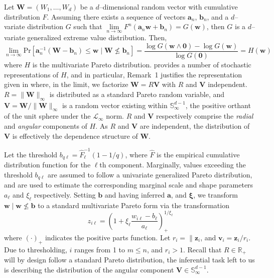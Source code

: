 Let $\bm{W} = (W_1,\ldots,W_d)$ be a $d$--dimensional random vector with 
    cumulative distribution $F$.  Assuming there exists a sequence of vectors
    $\bm{a}_n$, $\bm{b}_n$, and a $d$--variate distribution $G$ such that 
    $\lim\limits_{n\to\infty}F^n(\bm{a}_n\bm{w} + \bm{b}_n) = G(\bm{w})$, then
    $G$ is a $d$--variate generalized extreme value distribution.  Then,
    \[
        \lim\limits_{n\to\infty}\text{Pr}
            \left[\bm{a}_n^{-1}(\bm{W} - \bm{b}_n) 
                \leq \bm{w}\mid \bm{W}\not\leq \bm{b}_n\right]
        = \frac{\log G(\bm{w}\wedge \bm{0}) - \log G(\bm{w})}{\log G(\bm{0})}
        = H(\bm{w})
    \]
    where $H$ is the multivariate Pareto distribution.  \cite{rootzen2018}
    provides a number of stochastic representations of $H$, and in particular,
    Remark~1 justifies the representation given in \cite{ferreira2014} where,
    in the limit, we factorize $\bm{W} = R\bm{V}$ with $R$ and $\bm{V}$ independent.
    $R = \lVert \bm{W}\rVert_{\infty}$ is distributed as a standard Pareto random
    variable, and $\bm{V} = \bm{W} / \lVert \bm{W}\rVert_{\infty}$ is a random
    vector existing within $\mathbb{S}_{\infty}^{d-1}$, the positive orthant of
    the unit sphere under the $\mathcal{L}_{\infty}$ norm.  $R$ and $\bm{V}$
    respectively comprise the \emph{radial} and \emph{angular} components of $H$.
    As $R$ and $\bm{V}$ are independent,  the distribution of $\bm{V}$ is 
    effectively the dependence structure of $\bm{W}$.

Let the threshold $b_{q\ell} = \hat{F}_{\ell}^{-1}(1 - 1/q)$, where $\hat{F}$ is
    the empirical cumulative distribution function for the $\ell$th component.
    Marginally, values exceeding the threshold $b_{q\ell}$ are assumed to follow
    a univariate generalized Pareto distribution, and are used to estimate the
    corresponding marginal scale and shape parameters $a_{\ell}$ and $\xi_{\ell}$
    respectively.  Setting $\bm{b}$ and having inferred $\bm{a}$, and $\bm{\xi}$, 
    we transform $\bm{w}\mid \bm{w}\not\leq \bm{b}$ to a standard multivariate 
    Pareto form via the transformation
    \begin{equation}
        z_{i\ell} = \left(1 + \xi_{\ell}\frac{w_{i\ell} 
            - b_{\ell}}{a_{\ell}}\right)_{+}^{1 / \xi_{\ell}}
    \end{equation}
    where $(\cdot)_+$ indicates the positive parts function.  Let 
    $r_i = \lVert \bm{z}_i$, and $\bm{v}_i = \bm{z}_i / r_i$.  Due to 
    thresholding, $i$ ranges from 1 to $m\leq n$, and $r_i > 1$.  Recall that
    $R\in\mathbb{R}_+$ will by design follow a standard Pareto distribution,
    the inferential task left to us is describing the distribution of the
    angular component $\bm{V}\in\mathbb{S}_{\infty}^{d-1}$.  

